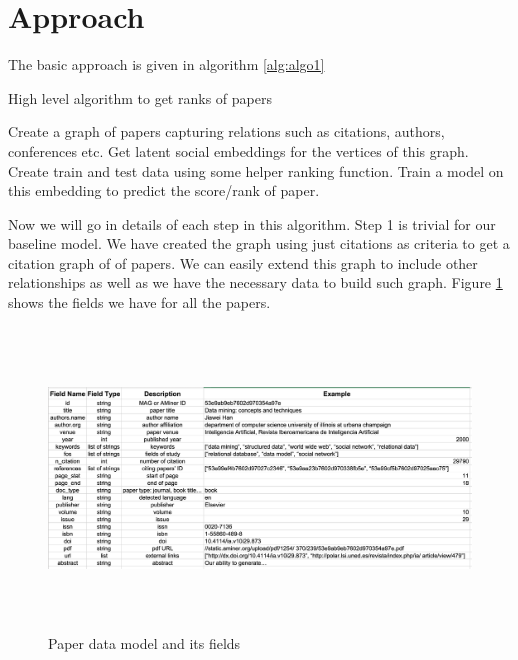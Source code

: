 \documentclass[a4paper, 11pt]{article}
\begin{document}
\section{Approach}
The basic approach is given in algorithm \ref{alg:algo1}
\begin{algorithm}
\caption{High level algorithm to get ranks of papers}
\label{alg:algo1}
\begin{algorithmic}[1]
\State Create a graph of papers capturing relations such as citations, authors, conferences etc.
\State Get latent social embeddings for the vertices of this graph. 
\State Create train and test data using some helper ranking function.
\State Train a model on this embedding to predict the score/rank of paper.
\end{algorithmic}
\end{algorithm}
Now we will go in details of each step in this algorithm. Step 1 is trivial for our baseline model. We have created the graph using just citations as criteria to get a citation graph of of papers. We can easily extend this graph to include other relationships as well as we have the necessary data to build such graph. Figure \ref{fig:datamodel} shows the fields we have for all the papers.


\begin{figure}[h]
    \centering
    \includegraphics[width=17cm,height=8cm]{datamodel_new}
    \caption{Paper data model and its fields \cite{data}}
    \label{fig:datamodel}
\end{figure}
\end{document}
